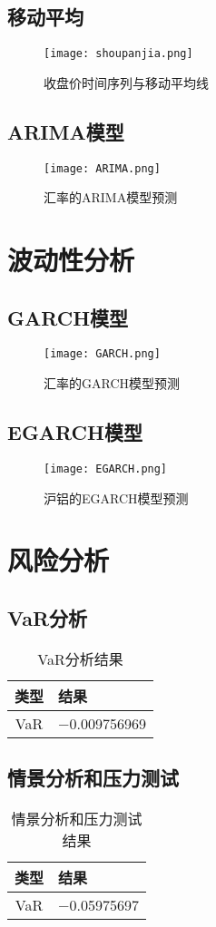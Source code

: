 \subsection{移动平均}
\begin{figure}[H]
  \centering
  \texttt{[image: shoupanjia.png]}
  \caption{收盘价时间序列与移动平均线}
  \label{shijian}
\end{figure}
\subsection{ARIMA模型}
\begin{figure}[H]
  \centering
  \texttt{[image: ARIMA.png]}
  \caption{汇率的ARIMA模型预测}
  \label{ARIMA}
\end{figure}

\section{波动性分析}
\subsection{GARCH模型}
\begin{figure}[H]
  \centering
  \texttt{[image: GARCH.png]}
  \caption{汇率的GARCH模型预测}
  \label{GARCH}
\end{figure}
\subsection{EGARCH模型}
\begin{figure}[H]
  \centering
  \texttt{[image: EGARCH.png]}
  \caption{沪铝的EGARCH模型预测}
  \label{EGARCH}
\end{figure}

\section{风险分析}
\subsection{VaR分析}
\begin{table}[H]
  \centering
  \caption{VaR分析结果}
  \label{VaR}
  \begin{tabular}{cl}
    \toprule
    类型   & 结果                                       \\
    \midrule
    VaR & \num{-0.009756969}\\
    \bottomrule
  \end{tabular}
\end{table}

\subsection{情景分析和压力测试}
\begin{table}[H]
  \centering
  \caption{情景分析和压力测试结果}
  \label{qingjing}
  \begin{tabular}{cl}
    \toprule
    类型   & 结果                                       \\
    \midrule
    VaR & \num{-0.05975697}\\
    \bottomrule
  \end{tabular}
\end{table}